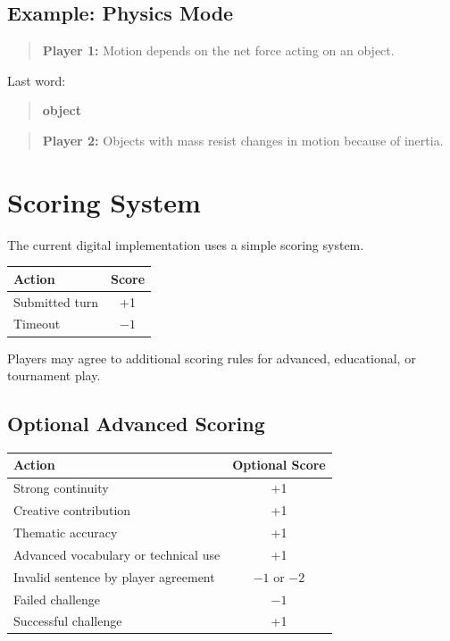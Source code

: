 \documentclass[11pt,a4paper]{article}
\begin{document}
\subsection{Example: Physics Mode}

\begin{quote}
\textbf{Player 1:} Motion depends on the net force acting on an object.
\end{quote}

Last word:

\begin{quote}
\textbf{object}
\end{quote}

\begin{quote}
\textbf{Player 2:} Objects with mass resist changes in motion because of inertia.
\end{quote}

\section{Scoring System}

The current digital implementation uses a simple scoring system.

\begin{center}
\begin{tabular}{lc}
\toprule
\textbf{Action} & \textbf{Score} \\
\midrule
Submitted turn & +1 \\
Timeout & $-1$ \\
\bottomrule
\end{tabular}
\end{center}

Players may agree to additional scoring rules for advanced, educational, or tournament play.

\subsection{Optional Advanced Scoring}

\begin{center}
\begin{tabular}{lc}
\toprule
\textbf{Action} & \textbf{Optional Score} \\
\midrule
Strong continuity & +1 \\
Creative contribution & +1 \\
Thematic accuracy & +1 \\
Advanced vocabulary or technical use & +1 \\
Invalid sentence by player agreement & $-1$ or $-2$ \\
Failed challenge & $-1$ \\
Successful challenge & +1 \\
\bottomrule
\end{tabular}
\end{center}
\end{document}
